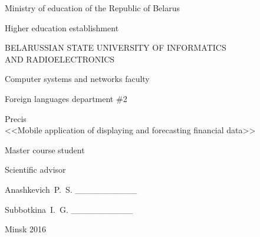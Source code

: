 \begin{titlepage}
\thispagestyle{empty}
\setlength{\parindent}{0cm} %

{\centering{}
  Ministry of education of the Republic of Belarus

  \smallskip
  Higher education establishment

  BELARUSSIAN STATE UNIVERSITY OF
  INFORMATICS \\ AND RADIOELECTRONICS

  \smallskip
  Computer systems and networks faculty

  \smallskip
  Foreign languages department \#2 \par
}

\vspace{60mm}

{\centering{}
  Precis \\ %
  <<Mobile application of displaying and forecasting financial data>> \par
}

\vspace{60mm}

\begin{minipage}{.55\linewidth}
  Master course student %

  \smallskip
  Scientific advisor
\end{minipage}
\hfill
\begin{minipage}{.4\linewidth}
  \begin{flushright}
    Anashkevich~P.~S. \_\_\_\_\_\_\_\_\_\_

    \smallskip
    Subbotkina~I.~G. \_\_\_\_\_\_\_\_\_\_ %
  \end{flushright}
\end{minipage}

\vfill
{\centering{}
  Minsk 2016\par
}

\setlength{\parindent}{1.25cm} %
\end{titlepage}
